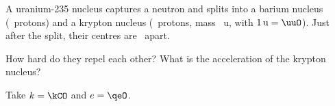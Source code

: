A uranium-235 nucleus captures a neutron and splits into a barium nucleus (\ZaO\ protons) and a krypton nucleus (\ZbO\ protons, mass \AO~u, with $1\,\mathrm{u} = \uuO$). Just after the split, their centres are \dfO\ apart.

\begin{abcliste}
\abc How hard do they repel each other?
\abc What is the acceleration of the krypton nucleus?
\end{abcliste}

Take $k = \kCO$ and $e = \qeO$.
